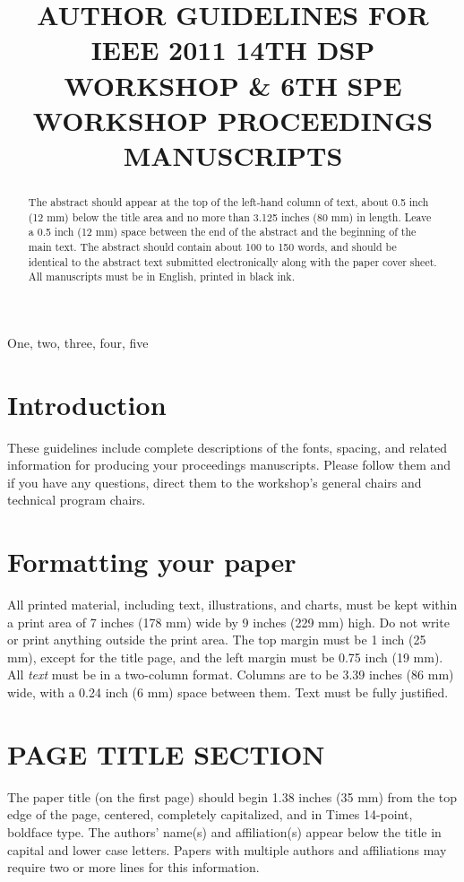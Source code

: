 \documentclass{article}
\title{AUTHOR GUIDELINES FOR IEEE 2011 14TH DSP WORKSHOP \& 6TH SPE WORKSHOP PROCEEDINGS MANUSCRIPTS}
\begin{document}
%
\maketitle
%
\begin{abstract}
The abstract should appear at the top of the left-hand column of text, about
0.5 inch (12 mm) below the title area and no more than 3.125 inches (80 mm) in
length.  Leave a 0.5 inch (12 mm) space between the end of the abstract and the
beginning of the main text.  The abstract should contain about 100 to 150
words, and should be identical to the abstract text submitted electronically
along with the paper cover sheet.  All manuscripts must be in English, printed
in black ink.
\end{abstract}
%
\begin{keywords}
One, two, three, four, five
\end{keywords}
%
\section{Introduction}
\label{sec:intro}

These guidelines include complete descriptions of the fonts, spacing, and
related information for producing your proceedings manuscripts. Please follow
them and if you have any questions, direct them to the workshop's general chairs 
and technical program chairs.

\section{Formatting your paper}
\label{sec:format}

All printed material, including text, illustrations, and charts, must be kept
within a print area of 7 inches (178 mm) wide by 9 inches (229 mm) high. Do
not write or print anything outside the print area. The top margin must be 1
inch (25 mm), except for the title page, and the left margin must be 0.75 inch
(19 mm).  All {\it text} must be in a two-column format. Columns are to be 3.39
inches (86 mm) wide, with a 0.24 inch (6 mm) space between them. Text must be
fully justified.

\section{PAGE TITLE SECTION}
\label{sec:pagestyle}

The paper title (on the first page) should begin 1.38 inches (35 mm) from the
top edge of the page, centered, completely capitalized, and in Times 14-point,
boldface type.  The authors' name(s) and affiliation(s) appear below the title
in capital and lower case letters.  Papers with multiple authors and
affiliations may require two or more lines for this information.
\end{document}
